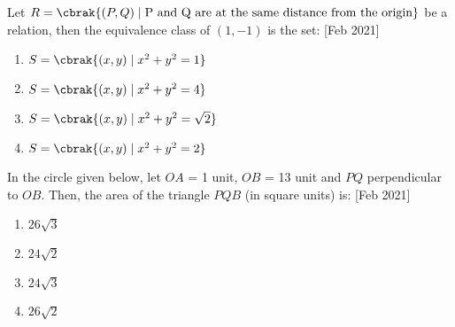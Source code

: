 \item Let $R = \cbrak{(P,Q) \mid \text{P and Q are at the same distance from the origin}}$
be a relation, then the equivalence class of $(1,-1)$ is the set:
\hfill{[Feb 2021]}

\begin{multicols}{2}
\begin{enumerate}
    \item $S = \cbrak{(x, y) \mid x^2 + y^2 = 1}$
    \item $S = \cbrak{(x, y) \mid x^2 + y^2 = 4}$
    \item $S = \cbrak{(x, y) \mid x^2 + y^2 = \sqrt{2}}$
    \item $S = \cbrak{(x, y) \mid x^2 + y^2 = 2}$
\end{enumerate}
\end{multicols}

\item In the circle given below, let $OA$ = 1 unit,
$OB$ = 13 unit and $PQ$ perpendicular to $OB$. Then, the area
of the triangle $PQB$ (in square units) is:
\hfill{[Feb 2021]}

\begin{center}
\end{center}

\begin{multicols}{4}
\begin{enumerate}
    \item $26 \sqrt{3}$
    \item $24 \sqrt{2}$
    \item $24 \sqrt{3}$
    \item $26 \sqrt{2}$
\end{enumerate}
\end{multicols}
